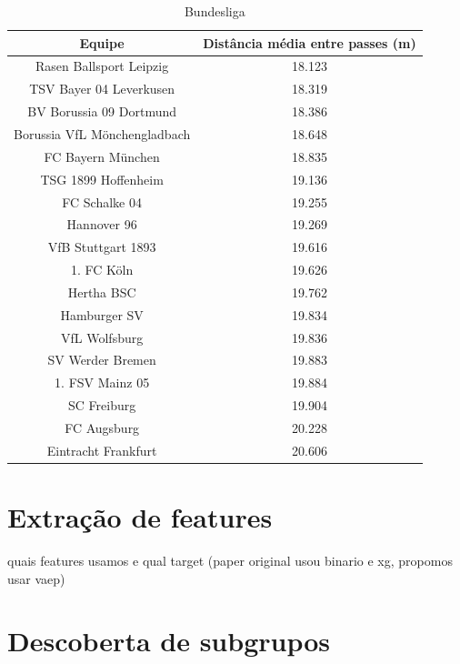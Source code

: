 \documentclass{article}
\begin{document}
\begin{table}[H]
	\centering
	\begin{tabular}{|c|c|}
		\hline
		\textbf{Equipe}              & \textbf{Distância média entre passes
		(m)}                                                                \\
		\hline
		Rasen Ballsport Leipzig      & 18.123
		\\ \hline
		TSV Bayer 04 Leverkusen      & 18.319
		\\ \hline
		BV Borussia 09 Dortmund      & 18.386
		\\ \hline
		Borussia VfL Mönchengladbach & 18.648
		\\ \hline
		FC Bayern München            & 18.835
		\\ \hline
		TSG 1899 Hoffenheim          & 19.136
		\\ \hline
		FC Schalke 04                & 19.255
		\\ \hline
		Hannover 96                  & 19.269
		\\ \hline
		VfB Stuttgart 1893           & 19.616
		\\ \hline
		1. FC Köln                   & 19.626
		\\ \hline
		Hertha BSC                   & 19.762
		\\ \hline
		Hamburger SV                 & 19.834
		\\ \hline
		VfL Wolfsburg                & 19.836
		\\ \hline
		SV Werder Bremen             & 19.883
		\\ \hline
		1. FSV Mainz 05              & 19.884
		\\ \hline
		SC Freiburg                  & 19.904
		\\ \hline
		FC Augsburg                  & 20.228
		\\ \hline
		Eintracht Frankfurt          & 20.606
		\\ \hline
	\end{tabular}
	\caption{Bundesliga}
	\label{tab:average_distance_germany}
\end{table}

\section{Extração de features}

quais features usamos e qual target (paper original usou binario e xg, propomos usar vaep)

\section{Descoberta de subgrupos}
\end{document}
